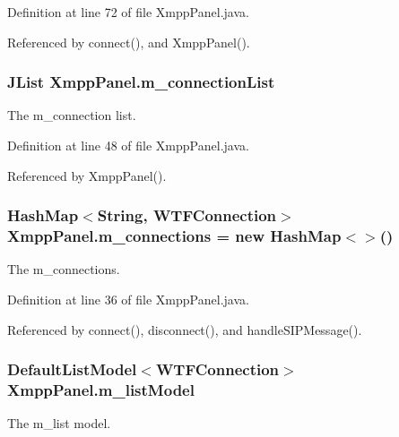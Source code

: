 Definition at line 72 of file Xmpp\-Panel.\-java.



Referenced by connect(), and Xmpp\-Panel().

\hypertarget{class_xmpp_panel_ab238edcd6185eb41b69800fc8d15ea9b}{
\subsubsection[{m\-\_\-connection\-List}]{\setlength{\rightskip}{0pt plus 5cm}J\-List Xmpp\-Panel.\-m\-\_\-connection\-List\hspace{0.3cm}{\ttfamily [private]}}}\label{class_xmpp_panel_ab238edcd6185eb41b69800fc8d15ea9b}
The m\-\_\-connection list. 

Definition at line 48 of file Xmpp\-Panel.\-java.



Referenced by Xmpp\-Panel().

\hypertarget{class_xmpp_panel_ab4b5f0dc078924949ac4c0c4674420d1}{
\subsubsection[{m\-\_\-connections}]{\setlength{\rightskip}{0pt plus 5cm}Hash\-Map$<$String, {\bf W\-T\-F\-Connection}$>$ Xmpp\-Panel.\-m\-\_\-connections = new Hash\-Map$<$$>$()\hspace{0.3cm}{\ttfamily [private]}}}\label{class_xmpp_panel_ab4b5f0dc078924949ac4c0c4674420d1}
The m\-\_\-connections. 

Definition at line 36 of file Xmpp\-Panel.\-java.



Referenced by connect(), disconnect(), and handle\-S\-I\-P\-Message().

\hypertarget{class_xmpp_panel_aa10db4c64a73d6034173cfff5aa7bd5d}{
\subsubsection[{m\-\_\-list\-Model}]{\setlength{\rightskip}{0pt plus 5cm}Default\-List\-Model$<${\bf W\-T\-F\-Connection}$>$ Xmpp\-Panel.\-m\-\_\-list\-Model\hspace{0.3cm}{\ttfamily [private]}}}\label{class_xmpp_panel_aa10db4c64a73d6034173cfff5aa7bd5d}
The m\-\_\-list model. 

